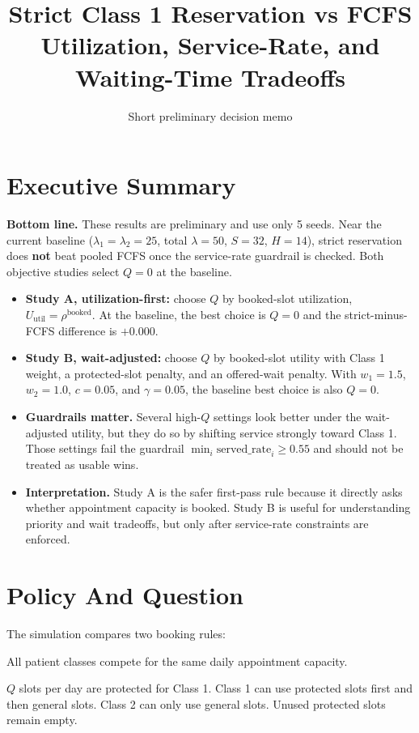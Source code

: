 \documentclass[11pt]{article}
\title{\vspace{-1.5em}Strict Class 1 Reservation vs FCFS\\
\large Utilization, Service-Rate, and Waiting-Time Tradeoffs}
\author{Short preliminary decision memo}
\date{}
\newcommand{\servedrate}{\mathrm{served\_rate}}
\newcommand{\bookedrho}{\rho^{\mathrm{booked}}}
\begin{document}
\maketitle

\section*{Executive Summary}

\textbf{Bottom line.} These results are preliminary and use only 5 seeds. Near the current baseline
($\lambda_1=\lambda_2=25$, total $\lambda=50$, $S=32$, $H=14$), strict reservation does
\textbf{not} beat pooled FCFS once the service-rate guardrail is checked. Both objective studies
select $Q=0$ at the baseline.

\begin{itemize}
  \item \textbf{Study A, utilization-first:} choose $Q$ by booked-slot utilization,
  $U_{\mathrm{util}}=\bookedrho$. At the baseline, the best choice is $Q=0$ and the strict-minus-FCFS
  difference is $+0.000$.
  \item \textbf{Study B, wait-adjusted:} choose $Q$ by booked-slot utility with Class 1 weight,
  a protected-slot penalty, and an offered-wait penalty. With $w_1=1.5$, $w_2=1.0$, $c=0.05$,
  and $\gamma=0.05$, the baseline best choice is also $Q=0$.
  \item \textbf{Guardrails matter.} Several high-$Q$ settings look better under the wait-adjusted
  utility, but they do so by shifting service strongly toward Class 1. Those settings fail the
  guardrail $\min_i \servedrate_i \ge 0.55$ and should not be treated as usable wins.
  \item \textbf{Interpretation.} Study A is the safer first-pass rule because it directly asks
  whether appointment capacity is booked. Study B is useful for understanding priority and wait
  tradeoffs, but only after service-rate constraints are enforced.
\end{itemize}

\section{Policy And Question}

The simulation compares two booking rules:

\begin{description}[leftmargin=1.8em, style=nextline]
  \item[Pooled FCFS] All patient classes compete for the same daily appointment capacity.
  \item[Strict Class 1 reservation] $Q$ slots per day are protected for Class 1. Class 1 can use
  protected slots first and then general slots. Class 2 can only use general slots. Unused protected
  slots remain empty.
\end{description}
\end{document}
